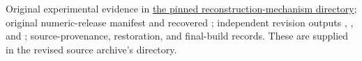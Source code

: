 \documentclass[11pt]{article}
\begin{document}
\begin{enumerate}[label={[\arabic*]},itemsep=9pt]
\item Original experimental evidence in
\href{https://github.com/MohitKumarRostock/Kernel_Affine_Hull_Koopman_Machine/tree/7dda356138675934aab5e327ec667bde0a5eda79/extensions/reconstruction_mechanism}{the pinned reconstruction-mechanism directory};
original numeric-release manifest and recovered
; independent revision outputs
,
, and
; source-provenance,
restoration, and final-build records. These are supplied in the revised
source archive's  directory.
\end{enumerate}
\end{document}
